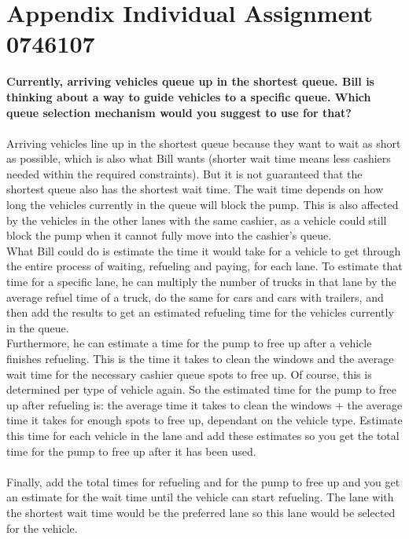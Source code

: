 \section{Appendix Individual Assignment 0746107}\label{app:indivbram}
\textbf{Currently, arriving vehicles queue up in the shortest queue. Bill is thinking about a way to guide vehicles to a specific queue. Which queue selection mechanism would you suggest to use for that?}\\
\\
Arriving vehicles line up in the shortest queue because they want to wait as short as possible, which is also what Bill wants (shorter wait time means less cashiers needed within the required constraints). But it is not guaranteed that the shortest queue also has the shortest wait time. The wait time depends on how long the vehicles currently in the queue will block the pump. This is also affected by the vehicles in the other lanes with the same cashier, as a vehicle could still block the pump when it cannot fully move into the cashier's queue.\\
What Bill could do is estimate the time it would take for a vehicle to get through the entire process of waiting, refueling and paying, for each lane. To estimate that time for a specific lane, he can multiply the number of trucks in that lane by the average refuel time of a truck, do the same for cars and cars with trailers, and then add the results to get an estimated refueling time for the vehicles currently in the queue.\\
Furthermore, he can estimate a time for the pump to free up after a vehicle finishes refueling. This is the time it takes to clean the windows and the average wait time for the necessary cashier queue spots to free up. Of course, this is determined per type of vehicle again. So the estimated time for the pump to free up after refueling is: the average time it takes to clean the windows + the average time it takes for enough spots to free up, dependant on the vehicle type. Estimate this time for each vehicle in the lane and add these estimates so you get the total time for the pump to free up after it has been used.\\\\
Finally, add the total times for refueling and for the pump to free up and you get an estimate for the wait time until the vehicle can start refueling. The lane with the shortest wait time would be the preferred lane so this lane would be selected for the vehicle.